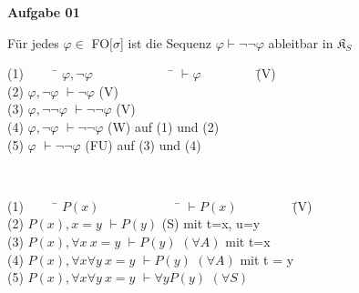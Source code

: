 \documentclass[a4paper,10pt]{article}
\begin{document}
	\parindent0pt
	\textbf{Aufgabe 01}\\
	
	\begin{compactenum} [(a)]
		\item Für jedes $ \varphi \in $ FO$[ \sigma $] ist die Sequenz $ \varphi \vdash \lnot \lnot \varphi $ ableitbar in $ \mathfrak{K}_S $
		\begin{tabbing}
			(1) $ \qquad $ \= $ \varphi, \lnot \varphi \qquad \qquad \qquad $ \= $\vdash \varphi \qquad \qquad $ \= (V)\\
			(2) \> $ \varphi, \lnot \varphi $ \> $ \vdash \lnot \varphi $ \> (V) \\
			(3) \> $ \varphi, \lnot \lnot \varphi $ \> $ \vdash \lnot \lnot \varphi $ \> (V) \\
			(4) \> $ \varphi, \lnot \varphi $ \> $ \vdash \lnot \lnot \varphi $ \> (W) auf (1) und (2)\\
			(5) \> $ \varphi $ \> $ \vdash \lnot \lnot \varphi $ \> (FU) auf (3) und (4)
		\end{tabbing}\
		
		\item 
		\begin{tabbing}
			(1) $ \qquad $ \= $ P(x) \qquad \qquad \qquad $ \= $\vdash P(x) \qquad \qquad $ \= (V)\\
			(2) \> $ P(x), x = y $ \> $ \vdash P(y) $ \> (S) mit t=x, u=y \\
			(3) \> $ P(x), \forall x\ x=y $ \> $ \vdash P(y) $ \> $ (\forall A)$ mit t=x\\
			(4) \> $ P(x), \forall x \forall y \ x=y$ \> $ \vdash P(y) $ \> $ (\forall A) $ mit t = y\\
			(5) \> $ P(x), \forall x \forall y \ x=y$ \> $ \vdash \forall y P(y) $ \> $ (\forall S) $
		\end{tabbing}\
	\end{compactenum}\ \\
	
\end{document}
